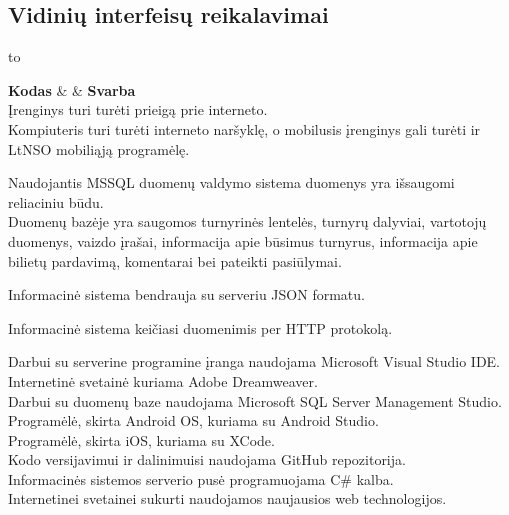 \documentclass{VUMIFPSkursinis}
\begin{document}
	\subsection*{Vidinių interfeisų reikalavimai}
    \begin{longtabu} to 
      \caption{Vidinių interfeisų reikalavimai}
      \label{table:VidiniuInterfeisuReikalavimai}
      \endfirsthead
      \endhead
      \hline
      \textbf{Kodas} &  & \textbf{Svarba} \\
      \hline
      {
        Įrenginys turi turėti prieigą prie interneto. \\
        Kompiuteris turi turėti interneto naršyklę, o mobilusis įrenginys gali turėti ir LtNSO mobiliąją programėlę. 
      }
    
      {
        Naudojantis MSSQL duomenų valdymo sistema duomenys yra išsaugomi reliaciniu būdu. \\
        Duomenų bazėje yra saugomos turnyrinės lentelės, turnyrų dalyviai, vartotojų duomenys, vaizdo įrašai, informacija apie būsimus turnyrus,
        informacija apie bilietų pardavimą, komentarai bei pateikti pasiūlymai.
      }
      
      {
        Informacinė sistema bendrauja su serveriu JSON formatu.
      }
      
      {
        Informacinė sistema keičiasi duomenimis per HTTP protokolą.
      }
      
      {
        Darbui su serverine programine įranga naudojama Microsoft Visual Studio IDE. \\
        Internetinė svetainė kuriama Adobe Dreamweaver. \\
        Darbui su duomenų baze naudojama Microsoft SQL Server Management Studio. \\
        Programėlė, skirta Android OS, kuriama su Android Studio. \\
        Programėlė, skirta iOS, kuriama su XCode. \\
        Kodo versijavimui ir dalinimuisi naudojama GitHub repozitorija. \\
        Informacinės sistemos serverio pusė programuojama C\# kalba. \\
        Internetinei svetainei sukurti naudojamos naujausios web technologijos.
      }
    \end{longtabu}
\end{document}
